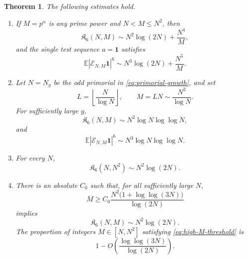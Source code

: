 \documentclass[11pt, twoside]{article}
\numberwithin{equation}{section}
\newtheorem{theorem}{Theorem}[section]
\theoremstyle{definition}
\newcommand{\E}{\mathbb E}
\newcommand{\cE}{\mathcal E}
\newcommand{\ind}{\mathbf 1}
\newcommand{\Ksix}{\mathfrak K_6}
\begin{document}
\begin{theorem}
\label{thm:M-classification}
The following estimates hold.
\begin{enumerate}
\item If $M=p^\alpha$ is any prime power and $N<M\leq N^2$, then
\begin{equation}\label{eq:classification-prime-power-rectangle}
\Ksix(N,M)
\sim N^2\log(2N)+\frac{N^4}{M},
\end{equation}
and the single test sequence $a=\ind$ satisfies
\begin{equation}\label{eq:classification-prime-power-ones}
\E|\cE_{N,M}\ind|^6
\sim N^3\log(2N)+\frac{N^5}{M}.
\end{equation}

\item Let $N=N_y$ be the odd primorial in
\eqref{eq:primorial-growth}, and set
$$
L=\left\lfloor\frac{N}{\log N}\right\rfloor,
\qquad
M=LN\sim\frac{N^2}{\log N}.
$$
For sufficiently large $y$,
$$
\Ksix(N,M)\sim N^2\log N\log\log N,
$$
and
\begin{equation}\label{eq:classification-transition-primorial-ones}
\E|\cE_{N,M}\ind|^6
\sim N^3\log N\log\log N.
\end{equation}

\item For every $N$,
$$
\Ksix(N,N^2)\sim N^2\log(2N).
$$

\item There is an absolute $C_0$ such that, for all sufficiently large $N$,
\begin{equation}\label{eq:high-M-threshold}
M\geq
C_0\frac{N^2\bigl(1+\log\log(3N)\bigr)}{\log(2N)}
\end{equation}
implies
\begin{equation}\label{eq:classification-high}
\Ksix(N,M)\sim N^2\log(2N).
\end{equation}
The proportion of integers $M\in[N,N^2]$ satisfying
\eqref{eq:high-M-threshold} is
\begin{equation}\label{eq:high-M-density}
1-O\left(\frac{\log\log(3N)}{\log(2N)}\right).
\end{equation}
\end{enumerate}
\end{theorem}
\end{document}
